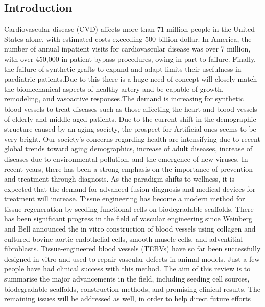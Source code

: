 \documentclass[12pt,letterpaper]{article}
\begin{document}
\begin{Summary}
\section{Introduction}
  Cardiovascular disease (CVD) affects more than 71 million people in the United States alone,
with estimated costs exceeding 500 billion dollar. In America, the number of annual inpatient visits for
cardiovascular disease was over 7 million, with over 450,000 in-patient bypass procedures,
owing in part to failure. Finally, the failure of synthetic grafts to expand and adapt limits their
usefulness in paediatric patients.Due to this there is a huge need of concept will closely match
the biomechanical aspects of healthy artery and be capable of growth, remodeling, and
vasoactive responses.The demand is increasing for synthetic blood vessels to treat diseases such as those affecting
the heart and blood vessels of elderly and middle-aged patients. Due to the current shift in the
demographic structure caused by an aging society, the prospect for Artificial ones seems to be
very bright. Our society’s concerns regarding health are intensifying due to recent global trends
toward aging demographics, increase of adult diseases, increase of diseases due to
environmental pollution, and the emergence of new viruses. In recent years, there has been a
strong emphasis on the importance of prevention and treatment through diagnosis. As the
paradigm shifts to wellness, it
is expected that the demand for advanced fusion diagnosis and medical devices for treatment
will increase.
Tissue engineering has become a modern method for tissue regeneration by seeding functional
cells on biodegradable scaffolds. There has been significant progress in the field of vascular
engineering since Weinberg and Bell announced the in vitro construction of blood vessels using
collagen and cultured bovine aortic endothelial cells, smooth muscle cells, and adventitial
fibroblasts. Tissue-engineered blood vessels (TEBVs) have so far been successfully designed in
vitro and used to repair vascular defects in animal models. Just a few people have had clinical
success with this method.
The aim of this review is to summarise the major advancements in the field, including seeding
cell sources, biodegradable scaffolds, construction methods, and promising clinical results. The
remaining issues will be addressed as well, in order to help direct future efforts

\end{Summary}
\end{document}
